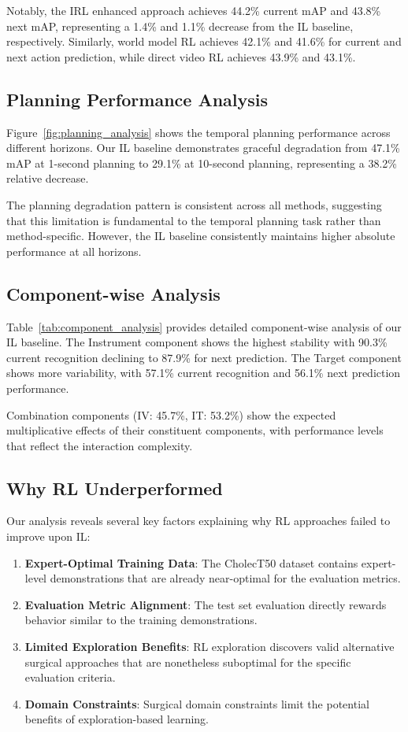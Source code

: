 \documentclass[runningheads]{llncs}
\begin{document}
Notably, the IRL enhanced approach achieves 44.2\% current mAP and 43.8\% next mAP, representing a 1.4\% and 1.1\% decrease from the IL baseline, respectively. Similarly, world model RL achieves 42.1\% and 41.6\% for current and next action prediction, while direct video RL achieves 43.9\% and 43.1\%.

\subsection{Planning Performance Analysis}

Figure~\ref{fig:planning_analysis} shows the temporal planning performance across different horizons. Our IL baseline demonstrates graceful degradation from 47.1\% mAP at 1-second planning to 29.1\% at 10-second planning, representing a 38.2\% relative decrease.

The planning degradation pattern is consistent across all methods, suggesting that this limitation is fundamental to the temporal planning task rather than method-specific. However, the IL baseline consistently maintains higher absolute performance at all horizons.

\subsection{Component-wise Analysis}

Table~\ref{tab:component_analysis} provides detailed component-wise analysis of our IL baseline. The Instrument component shows the highest stability with 90.3\% current recognition declining to 87.9\% for next prediction. The Target component shows more variability, with 57.1\% current recognition and 56.1\% next prediction performance.

Combination components (IV: 45.7\%, IT: 53.2\%) show the expected multiplicative effects of their constituent components, with performance levels that reflect the interaction complexity.

\subsection{Why RL Underperformed}

Our analysis reveals several key factors explaining why RL approaches failed to improve upon IL:

\begin{enumerate}
\item \textbf{Expert-Optimal Training Data}: The CholecT50 dataset contains expert-level demonstrations that are already near-optimal for the evaluation metrics.
\item \textbf{Evaluation Metric Alignment}: The test set evaluation directly rewards behavior similar to the training demonstrations.
\item \textbf{Limited Exploration Benefits}: RL exploration discovers valid alternative surgical approaches that are nonetheless suboptimal for the specific evaluation criteria.
\item \textbf{Domain Constraints}: Surgical domain constraints limit the potential benefits of exploration-based learning.
\end{enumerate}
\end{document}
